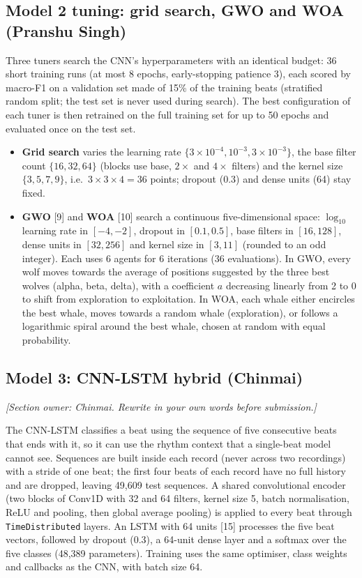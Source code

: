 \documentclass[11pt,a4paper]{article}
\begin{document}
\subsection{Model 2 tuning: grid search, GWO and WOA (Pranshu Singh)}
Three tuners search the CNN's hyperparameters with an identical budget: 36 short training runs (at most 8 epochs, early-stopping patience 3), each scored by macro-F1 on a validation set made of 15\% of the training beats (stratified random split; the test set is never used during search). The best configuration of each tuner is then retrained on the full training set for up to 50 epochs and evaluated once on the test set.

\begin{itemize}
\item \textbf{Grid search} varies the learning rate $\{3\times10^{-4}, 10^{-3}, 3\times10^{-3}\}$, the base filter count $\{16, 32, 64\}$ (blocks use base, $2\times$ and $4\times$ filters) and the kernel size $\{3, 5, 7, 9\}$, i.e.\ $3\times3\times4 = 36$ points; dropout (0.3) and dense units (64) stay fixed.
\item \textbf{GWO} [9] and \textbf{WOA} [10] search a continuous five-dimensional space: $\log_{10}$ learning rate in $[-4, -2]$, dropout in $[0.1, 0.5]$, base filters in $[16, 128]$, dense units in $[32, 256]$ and kernel size in $[3, 11]$ (rounded to an odd integer). Each uses 6 agents for 6 iterations (36 evaluations). In GWO, every wolf moves towards the average of positions suggested by the three best wolves (alpha, beta, delta), with a coefficient $a$ decreasing linearly from 2 to 0 to shift from exploration to exploitation. In WOA, each whale either encircles the best whale, moves towards a random whale (exploration), or follows a logarithmic spiral around the best whale, chosen at random with equal probability.
\end{itemize}

\subsection{Model 3: CNN-LSTM hybrid (Chinmai)}
\textit{[Section owner: Chinmai. Rewrite in your own words before submission.]}

The CNN-LSTM classifies a beat using the sequence of five consecutive beats that ends with it, so it can use the rhythm context that a single-beat model cannot see. Sequences are built inside each record (never across two recordings) with a stride of one beat; the first four beats of each record have no full history and are dropped, leaving 49,609 test sequences. A shared convolutional encoder (two blocks of Conv1D with 32 and 64 filters, kernel size 5, batch normalisation, ReLU and pooling, then global average pooling) is applied to every beat through \texttt{TimeDistributed} layers. An LSTM with 64 units [15] processes the five beat vectors, followed by dropout (0.3), a 64-unit dense layer and a softmax over the five classes (48,389 parameters). Training uses the same optimiser, class weights and callbacks as the CNN, with batch size 64.
\end{document}
